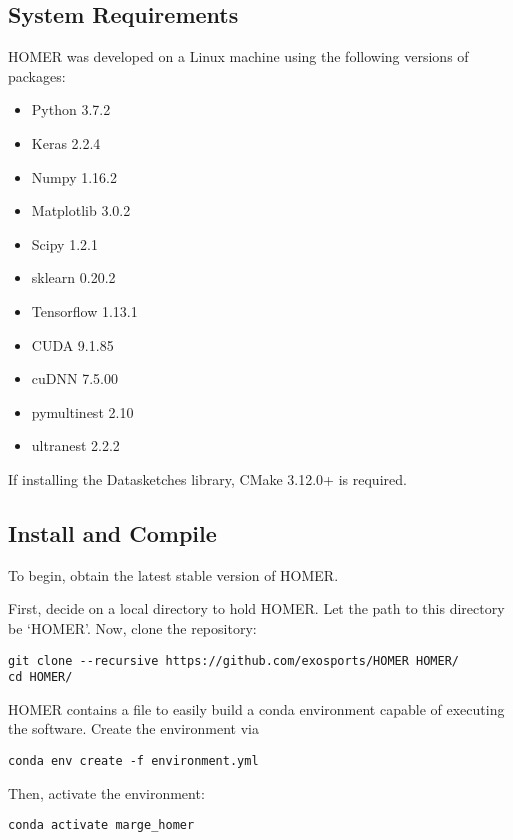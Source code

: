 \documentclass[letterpaper, 12pt]{article}
\begin{document}
\subsection{System Requirements}
\label{sec:requirements}

\noindent HOMER was developed on a Linux machine using the following 
versions of packages:

\begin{itemize}
\item Python 3.7.2
\item Keras 2.2.4
\item Numpy 1.16.2
\item Matplotlib 3.0.2
\item Scipy 1.2.1
\item sklearn 0.20.2
\item Tensorflow 1.13.1
\item CUDA 9.1.85
\item cuDNN 7.5.00
\item pymultinest 2.10
\item ultranest 2.2.2
\end{itemize}


\noindent If installing the Datasketches library, CMake 3.12.0+ is required.



\subsection{Install and Compile}
\label{sec:install}

\noindent To begin, obtain the latest stable version of HOMER.  

\noindent First, decide on a local directory to hold HOMER.  Let the path to this directory 
be `HOMER'.  Now, clone the repository:
\begin{verbatim}
git clone --recursive https://github.com/exosports/HOMER HOMER/
cd HOMER/
\end{verbatim}

\noindent HOMER contains a file to easily build a conda environment capable of 
executing the software.  Create the environment via

\begin{verbatim}
conda env create -f environment.yml
\end{verbatim}

\noindent Then, activate the environment:

\begin{verbatim}
conda activate marge_homer
\end{verbatim}
\end{document}
